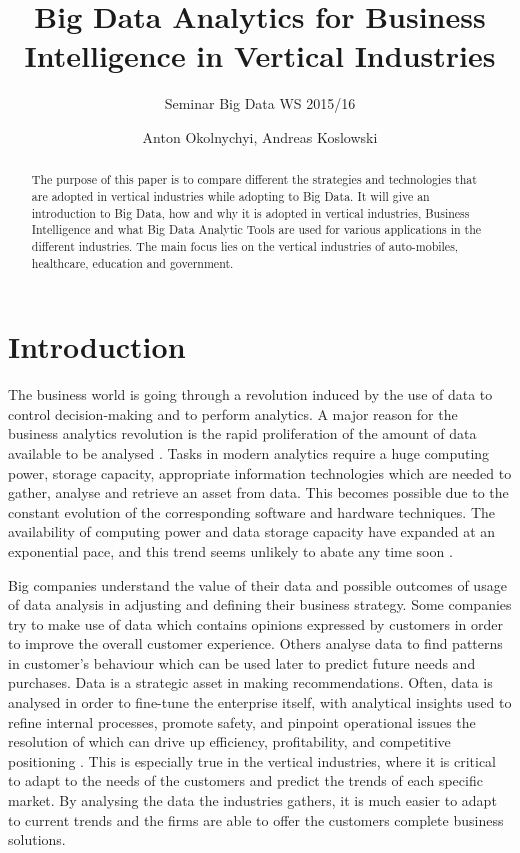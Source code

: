 \documentclass[runningheads]{llncs}
\title{Big Data Analytics for Business Intelligence in Vertical Industries}
\subtitle{Seminar Big Data WS 2015/16}
\author{Anton Okolnychyi, Andreas Koslowski}
\institute{RWTH Aachen University, 52056 Aachen, Germany\\
\{anton.okolnychyi, andreas.koslowski\}@rwth-aachen.de}
\begin{document}
\maketitle

\begin{abstract}
The purpose of this paper is to compare different the strategies and technologies that are adopted in vertical industries while adopting to Big Data. It will give an introduction to Big Data, how and why it is adopted in vertical industries, Business Intelligence and what Big Data Analytic Tools are used for various applications in the different industries. The main focus lies on the vertical industries of auto-mobiles,  healthcare, education and government.
\end{abstract}

\section{Introduction}
The business world is going through a revolution induced by the use of data to control decision-making and to perform analytics. A major reason for the business analytics revolution is the rapid proliferation of the amount of data available to be analysed \cite{Gopalkrishnan}. Tasks in modern analytics require a huge computing power, storage capacity, appropriate information technologies which are needed to gather, analyse and retrieve an asset from data. This becomes possible due to the constant evolution of the corresponding software and hardware techniques. The availability of computing power and data storage capacity have expanded at an exponential pace, and this trend seems unlikely to abate any time soon \cite{NYTIMES}.  

Big companies understand the value of their data and possible outcomes of usage of data analysis in adjusting and defining their business strategy.  Some companies try to make use of data which contains opinions expressed by customers in order to improve the overall customer experience. Others analyse data to find patterns in customer's behaviour which can be used later to predict future needs and purchases. Data is a strategic asset in making recommendations. Often, data is analysed in order to fine-tune the enterprise itself, with analytical insights used to refine internal processes, promote safety, and pinpoint operational issues the resolution of which can drive up efficiency, profitability, and competitive positioning \cite{Guszcza}.
This is especially true in the vertical industries, where it is critical to adapt to the needs of the customers and predict the trends of each specific market. By analysing the data the industries gathers, it is much easier to adapt to current trends and the firms are able to offer the customers complete business solutions.
\end{document}
